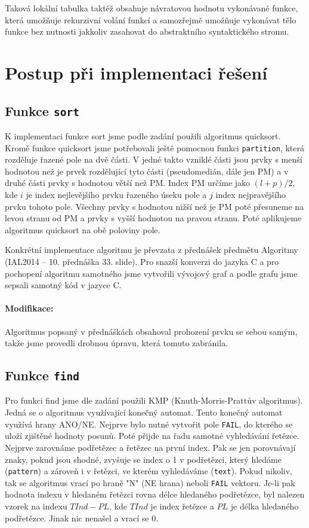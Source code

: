 \documentclass[12pt,a4paper,titlepage,final]{article}
\begin{document}
Taková lokální tabulka taktéž obsahuje návratovou hodnotu vykonávané funkce,
která umožňuje rekurzivní volání funkcí a samozřejmě umožňuje vykonávat tělo
funkce bez nutnosti jakkoliv zasahovat do abstraktního syntaktického stromu.


\section{Postup při implementaci řešení} \label{postup_pri_implementaci_reseni}
\subsection{Funkce \texttt{sort}}
K implementaci funkce sort jsme podle zadání použili algoritmus quicksort.
Kromě funkce quicksort jsme potřebovali ještě pomocnou funkci \verb|partition|,
která rozděluje řazené pole na dvě části. V jedné takto vzniklé části jsou prvky
s menší hodnotou než je prvek rozdělující tyto části (pseudomedián, dále jen PM)
a v druhé části prvky s hodnotou větší než PM. Index PM určíme jako $(l+p)/2$, kde
$i$ je index nejlevějšího prvku řazeného úseku pole a $j$ index nejpravějšího prvku
tohoto pole. Všechny prvky s hodnotou nižší než je PM poté přesuneme na levou
stranu od PM a prvky s vyšší hodnotou na pravou stranu. Poté aplikujeme algoritmus
quicksort na obě poloviny pole.

Konkrétní implementace algoritmu je převzata z přednášek předmětu Algoritmy
(IAL2014 \cite{honzik2} -- 10. přednáška 33. slide). Pro snazší konverzi do jazyka
C a pro pochopení algoritmu samotného jsme vytvořili vývojový graf a podle grafu
jsme sepsali samotný kód v jazyce C.

\paragraph{Modifikace:} Algoritmus popsaný v přednáškách obsahoval prohození
prvku se sebou samým, takže jsme provedli drobnou úpravu, která tomuto zabránila.

\subsection{Funkce \texttt{find}}
Pro funkci find jsme dle zadání použili KMP (Knuth-Morris-Prattův algoritmus).
Jedná se o algoritmus využívající konečný automat. Tento konečný automat využívá
hrany ANO/NE. Nejprve bylo nutné vytvořit pole \verb|FAIL|, do kterého se
uloží zjištěné hodnoty posunů. Poté přijde na řadu samotné vyhledávání řetězce.
Nejprve zarovnáme podřetězec a řetězec na první index. Pak se jen porovnávají znaky,
pokud jsou shodné, zvyšuje se index o 1 v podřetězci, který hledáme (\verb|pattern|)
a zároveň i v řetězci, ve kterém vyhledáváme (\verb|text|). Pokud nikoliv, tak se
algoritmus vrací po hraně "N" (NE hrana) neboli \verb|FAIL| vektoru. Je-li pak hodnota indexu
v hledaném řetězci rovna délce hledaného podřetězce, byl nalezen vzorek na
indexu $TInd - PL$, kde $TInd$ je index řetězce a $PL$ je délka hledaného podřetězce.
Jinak nic nenašel a vrací se 0.
\end{document}
